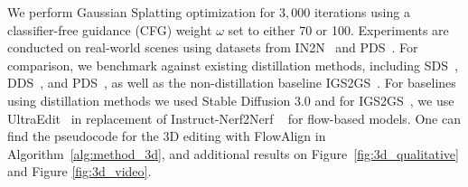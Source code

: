 We perform Gaussian Splatting optimization for $3,000$ iterations using a classifier-free guidance (CFG) weight $\omega$ set to either 70 or 100.
Experiments are conducted on real-world scenes using datasets from IN2N~\cite{haque2023instruct} and PDS~\cite{koo2024posterior}. For comparison, we benchmark against existing distillation methods, including SDS~\cite{poole2022dreamfusion}, DDS~\cite{hertz2023delta}, and PDS~\cite{koo2024posterior}, as well as the non-distillation baseline IGS2GS~\cite{igs2gs}. For baselines using distillation methods we used Stable Diffusion 3.0 and for IGS2GS~\cite{igs2gs}, we use UltraEdit~\cite{zhao2024ultraedit} in replacement of Instruct-Nerf2Nerf ~\cite{haque2023instruct} for flow-based models.
One can find the pseudocode for the 3D editing with FlowAlign in Algorithm~\ref{alg:method_3d}, and additional results on Figure~\ref{fig:3d_qualitative} and Figure \ref{fig:3d_video}.
